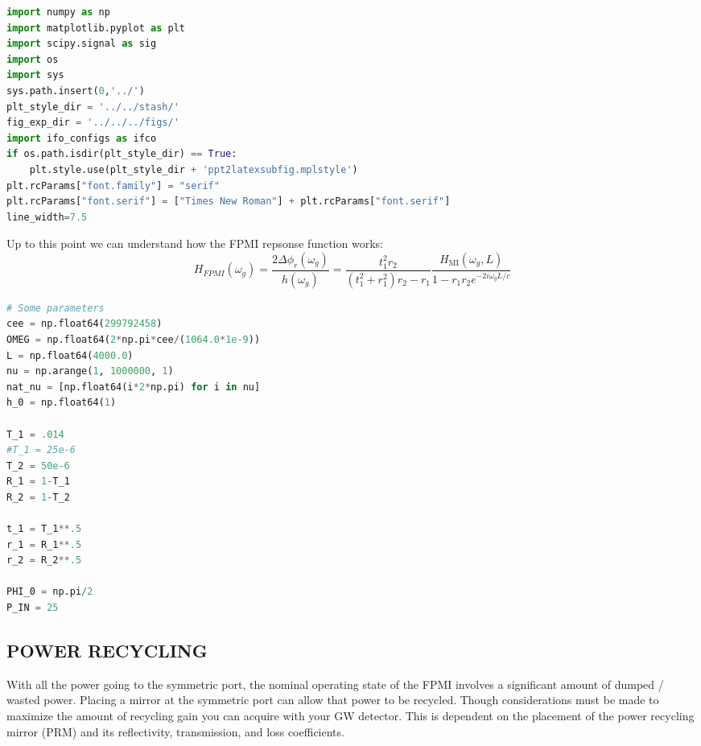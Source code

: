 \begin{spacing}{1}
\begin{spacing}{1}\begin{lstlisting}[frame=single, language=Python]
import numpy as np 
import matplotlib.pyplot as plt
import scipy.signal as sig
import os 
import sys
sys.path.insert(0,'../')
plt_style_dir = '../../stash/'
fig_exp_dir = '../../../figs/'
import ifo_configs as ifco
if os.path.isdir(plt_style_dir) == True:
    plt.style.use(plt_style_dir + 'ppt2latexsubfig.mplstyle')
plt.rcParams["font.family"] = "serif"
plt.rcParams["font.serif"] = ["Times New Roman"] + plt.rcParams["font.serif"]
line_width=7.5
\end{lstlisting}\end{spacing}
\end{spacing}

Up to this point we can understand how the FPMI repsonse function works:
\begin{equation} H_{FPMI}(\omega_g) = \frac{2 \Delta \phi_r(\omega_g)}{h(\omega_g)} =  \frac{t_1^2r_2}{(t_1^2 + r_1^2)r_2 -r_1} \frac{H_{\mathrm{MI}}(\omega_g, L)}{1-r_1r_2e^{-2i \omega_g L /c }}  \end{equation}

\begin{spacing}{1}\begin{lstlisting}[frame=single, language=Python]
# Some parameters
cee = np.float64(299792458)
OMEG = np.float64(2*np.pi*cee/(1064.0*1e-9))
L = np.float64(4000.0)
nu = np.arange(1, 1000000, 1)
nat_nu = [np.float64(i*2*np.pi) for i in nu]
h_0 = np.float64(1)

T_1 = .014
#T_1 = 25e-6 
T_2 = 50e-6
R_1 = 1-T_1
R_2 = 1-T_2

t_1 = T_1**.5
r_1 = R_1**.5
r_2 = R_2**.5 

PHI_0 = np.pi/2 
P_IN = 25
\end{lstlisting}\end{spacing}

\subsection{POWER RECYCLING}

With all the power going to the symmetric port, the nominal operating
state of the FPMI involves a significant amount of dumped / wasted
power. Placing a mirror at the symmetric port can allow that power to be
recycled. Though considerations must be made to maximize the amount of
recycling gain you can acquire with your GW detector. This is dependent
on the placement of the power recycling mirror (PRM) and its
reflectivity, transmission, and loss coefficients.

